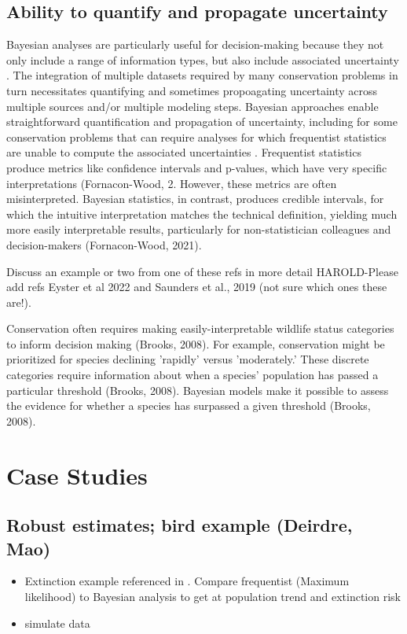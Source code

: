 \documentclass{article}
\begin{document}
\subsection*{Ability to quantify and propagate uncertainty} 
\par Bayesian analyses are particularly useful for decision-making because they not only include a range of information types, but also include associated uncertainty \citep{stern2022interweaving}. The integration of multiple datasets required by many conservation problems in turn necessitates quantifying and sometimes propoagating uncertainty across multiple sources and/or multiple modeling steps. Bayesian approaches enable straightforward quantification and  propagation of  uncertainty, including for some conservation problems that can require analyses for which frequentist statistics are unable to compute the associated uncertainties \citep{bolker2009a,bates2006r}. Frequentist statistics produce metrics like confidence intervals and p-values, which have very specific interpretations \citep{fornacon2021bayesian}(Fornacon-Wood, 2. However, these metrics are often misinterpreted. Bayesian statistics, in contrast, produces credible intervals, for which the intuitive interpretation matches the technical definition, yielding much more easily interpretable results, particularly for non-statistician colleagues and decision-makers (Fornacon-Wood, 2021). 
\par Discuss an example or two from one of these refs in more detail \citep{draper1995assessment,gilbert2023propagating} HAROLD-Please add refs Eyster et al 2022 and Saunders et al., 2019 (not sure which ones these are!). 


\par Conservation often requires making easily-interpretable wildlife status categories to inform decision making (Brooks, 2008). For example, conservation might be prioritized for species declining 'rapidly' versus 'moderately.' These discrete categories require information about when a species' population has passed a particular threshold (Brooks, 2008).  Bayesian models make it possible to assess the evidence for whether a species has surpassed a given threshold (Brooks, 2008). 


\section* {Case Studies}
\subsection*{Robust estimates; bird example (Deirdre, Mao)}
\begin{itemize}

\item Extinction example referenced in \citep{wade2000bayesian}. Compare frequentist (Maximum likelihood) to Bayesian analysis to get at population trend and extinction risk 
\item simulate data
\end{itemize}
\end{document}
